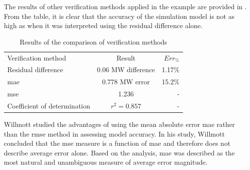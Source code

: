  The results of other verification methods applied in the example are provided in . From the table, it is clear that the accuracy of the simulation model is not as high as when it was interpreted using the residual difference alone.\\
 	\par 
 \begin{table}[!htbp]
 	\caption{Results of the comparison of verification methods}
 	\centering
 	\begin{tabular}{lcr}
 		\hline
 		Verification method & Result & $Err_{\%}$\\
 		\hhline{===}
 		Residual difference     & 0.06 MW difference & 1.17\% \\
 		\gls{mae} 					 & 0.778 MW error & 15.2\% \\
 		\gls{mse} 				   & 1.236  & -\\
 		Coefficient of determination & $r^2 =0.857$  & -\\
 		\hline
 	\end{tabular} 
 \label{Philip verification table}
 \end{table}
 	Willmott \cite{willmott2005advantages} studied the advantages of using the mean absolute error \gls{mae} rather than the \gls{rmse} method in assessing model accuracy. In his study, Willmott concluded that the \gls{mse} measure is a function of \gls{mae} and therefore does not describe average error alone. Based on the analysis, \gls{mae} was described as the most natural and unambiguous measure of average error magnitude.

